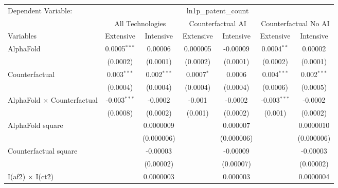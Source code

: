 \begingroup
\centering
\begin{tabular}{lcccccc}
   \tabularnewline \midrule \midrule
   Dependent Variable: & \multicolumn{6}{c}{ln1p\_patent\_count}\\
 & \multicolumn{2}{c}{All Technologies} & \multicolumn{2}{c}{Counterfactual AI} & \multicolumn{2}{c}{Counterfactual No AI} \\
\cmidrule(lr){1-1}\cmidrule(lr){2-3} \cmidrule(lr){4-5} \cmidrule(lr){6-7}
Variables & \multicolumn{1}{c}{Extensive} & \multicolumn{1}{c}{Intensive} & \multicolumn{1}{c}{Extensive} & \multicolumn{1}{c}{Intensive} & \multicolumn{1}{c}{Extensive} & \multicolumn{1}{c}{Intensive} \\
\cmidrule(lr){1-1}\cmidrule(lr){2-2} \cmidrule(lr){3-3} \cmidrule(lr){4-4} \cmidrule(lr){5-5} \cmidrule(lr){6-6} \cmidrule(lr){7-7}
   AlphaFold                          & 0.0005$^{***}$ & 0.00006       & 0.000005     & -0.00009   & 0.0004$^{**}$  & 0.00002\\   
                                      & (0.0002)       & (0.0001)      & (0.0002)     & (0.0001)   & (0.0002)       & (0.0001)\\   
   Counterfactual                     & 0.003$^{***}$  & 0.002$^{***}$ & 0.0007$^{*}$ & 0.0006     & 0.004$^{***}$  & 0.002$^{***}$\\   
                                      & (0.0004)       & (0.0004)      & (0.0004)     & (0.0004)   & (0.0006)       & (0.0005)\\   
   AlphaFold $\times$ Counterfactual  & -0.003$^{***}$ & -0.0002       & -0.001       & -0.0002    & -0.003$^{***}$ & -0.0002\\   
                                      & (0.0008)       & (0.0002)      & (0.001)      & (0.0002)   & (0.001)        & (0.0002)\\   
   AlphaFold square                   &                & 0.0000009     &              & 0.000007   &                & 0.0000010\\   
                                      &                & (0.000006)    &              & (0.000006) &                & (0.000006)\\   
   Counterfactual square              &                & -0.00003      &              & -0.00009   &                & -0.00003\\   
                                      &                & (0.00002)     &              & (0.00007)  &                & (0.00002)\\   
   I(af\^2) $\times$ I(ct\^2)         &                & 0.0000003     &              & 0.000003   &                & 0.0000004\\   

\end{tabular}
